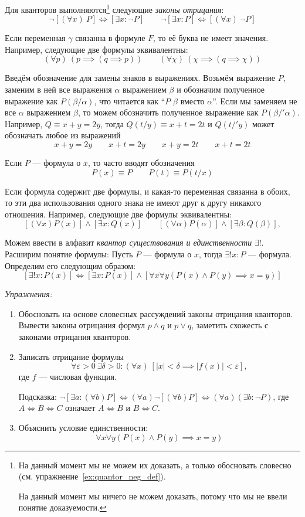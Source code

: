 Для кванторов выполняются\footnote{
	На данный момент мы не можем их доказать, а только
	обосновать словесно (см. упражнение~\ref{ex:quantor_neg_def}).

	На данный момент мы ничего не можем доказать, потому что мы не ввели
	понятие доказуемости.}
следующие {\it законы отрицания}:
\[
	\lnot[(\forall x)~P]\iff[\exists x:\lnot P]\qquad
	\lnot[\exists x:P]\iff[(\forall x)~\lnot P]
\]

Если переменная $\gamma$ связанна в формуле $F$, то её буква не имеет значения.
Например, следующие две формулы эквивалентны:
\[
	(\forall p)~(p\implies (q\implies p))\qquad
	(\forall \chi)~(\chi\implies (q\implies\chi))
\]

Введём обозначение для замены знаков в выражениях.
Возьмём выражение $P$, заменим в ней все выражения $\alpha$ выражением $\beta$ и
обозначим полученное выражение как $P(\beta/\alpha)$, что читается как
``$P$ $\beta$ вместо $\alpha$''.
Если мы заменяем не все $\alpha$ выражением $\beta$, то можем обозначить полученное
выражение как $P(\beta/'\alpha)$.
Например, $Q\equiv x+y=2y$, тогда $Q(t/y)\equiv x+t=2t$ и $Q(t/'y)$ может
обозначать любое из выражений
\[
	x+y=2y\qquad x+t=2y\qquad x+y=2t\qquad x+t=2t
\]

Если $P$ --- формула о $x$, то часто вводят обозначения
\[
	P(x)\equiv P\qquad P(t)\equiv P(t/x)
\]

Если формула содержит две формулы, и какая-то переменная
связанна в обоих, то эти два использования
одного знака не имеют друг к другу никакого отношения.
Например, следующие две формулы эквивалентны:
\[
	[(\forall x)P(x)]\land[\exists x:Q(x)]\qquad
	[(\forall \alpha)P(\alpha)]\land[\exists \beta:Q(\beta)],
\]

\label{page:exists_only}
Можем ввести в алфавит {\it квантор существования и единственности} $\exists!$.
Расширим понятие формулы: Пусть $P$ --- формула о $x$,
тогда ${\exists! x:P}$ --- формула. Определим его следующим образом:
\[
	[\exists! x:P(x)]\iff[\exists x:P(x)]\land
	[\forall x\forall y(P(x)\land P(y)\implies x=y)]
\]

\vspace{1em}
{\it Упражнения:}
\begin{enumerate}
	\item{}Обосновать на основе словесных рассуждений законы отрицания
		кванторов\label{ex:quantor_neg_def}. Вывести законы отрицания формул
		$p\land q$ и $p\lor q$, заметить схожесть с законами отрицания кванторов.
	\item{}Записать отрицание формулы
		\[
			\forall \varepsilon>0~\exists \delta>0:
			(\forall x)~[|x|<\delta\implies |f(x)|<\varepsilon],
		\]
		где $f$ --- числовая функция.

		Подсказка:
		${\lnot[\exists a:(\forall b)P]\iff(\forall a)\lnot[(\forall b)P]\iff
		(\forall a)(\exists b:\lnot P)}$,
		где $A\iff B\iff C$ означает $A\iff B$ и $B\iff C$.

	\item{}Объяснить условие единственности:
		\[
			\forall x\forall y(P(x)\land P(y)\implies x=y)
		\]
\end{enumerate}
